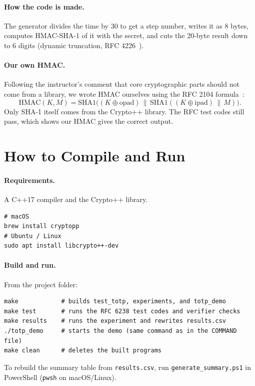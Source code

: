 \documentclass[11pt]{article}
\begin{document}
\paragraph{How the code is made.} The generator divides the time by 30 to get
a step number, writes it as 8 bytes, computes HMAC-SHA-1 of it with the secret,
and cuts the 20-byte result down to 6 digits (dynamic truncation, RFC
4226~\cite{rfc4226}).

\paragraph{Our own HMAC.} Following the instructor's comment that core
cryptographic parts should not come from a library, we wrote HMAC ourselves
using the RFC 2104 formula~\cite{rfc2104}:
\[
  \text{HMAC}(K, M) = \text{SHA1}\big((K \oplus \text{opad}) \,\|\,
  \text{SHA1}((K \oplus \text{ipad}) \,\|\, M)\big).
\]
Only SHA-1 itself comes from the Crypto++ library. The RFC test codes still
pass, which shows our HMAC gives the correct output.

\section{How to Compile and Run}

\paragraph{Requirements.} A C++17 compiler and the Crypto++ library.
\begin{lstlisting}
# macOS
brew install cryptopp
# Ubuntu / Linux
sudo apt install libcrypto++-dev
\end{lstlisting}

\paragraph{Build and run.} From the project folder:
\begin{lstlisting}
make            # builds test_totp, experiments, and totp_demo
make test       # runs the RFC 6238 test codes and verifier checks
make results    # runs the experiment and rewrites results.csv
./totp_demo     # starts the demo (same command as in the COMMAND file)
make clean      # deletes the built programs
\end{lstlisting}
To rebuild the summary table from \texttt{results.csv}, run
\texttt{generate\_summary.ps1} in PowerShell (\texttt{pwsh} on macOS/Linux).
\end{document}
